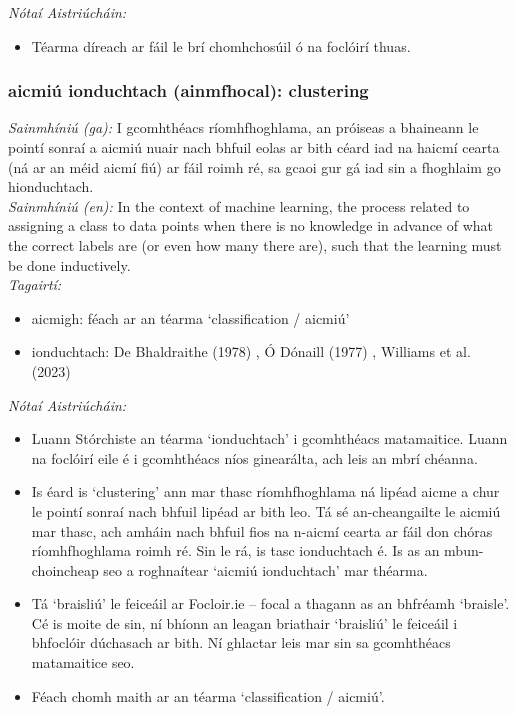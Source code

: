 \documentclass{article}
\begin{document}
 \noindent \textit{Nótaí Aistriúcháin:}
\begin{itemize}
	\item Téarma díreach ar fáil le brí chomhchosúil ó na foclóirí thuas.
\end{itemize}


\subsubsection*{aicmiú ionduchtach (ainmfhocal): clustering}
 \noindent \textit{Sainmhíniú (ga):} I gcomhthéacs ríomhfhoghlama, an próiseas a bhaineann le pointí sonraí a aicmiú nuair nach bhfuil eolas ar bith céard iad na haicmí cearta (ná ar an méid aicmí fiú) ar fáil roimh ré, sa gcaoi gur gá iad sin a fhoghlaim go hionduchtach.
\\
 \noindent \textit{Sainmhíniú (en):} In the context of machine learning, the process related to assigning a class to data points when there is no knowledge in advance of what the correct labels are (or even how many there are), such that the learning must be done inductively.
\\
 \noindent \textit{Tagairtí:}
\begin{itemize}
	\item aicmigh: féach ar an téarma `classification / aicmiú'
	\item ionduchtach: De Bhaldraithe (1978) \cite{de-bhaldraithe}, Ó Dónaill (1977) \cite{odonaill}, Williams et al. (2023) \cite{storchiste}
\end{itemize}

 \noindent \textit{Nótaí Aistriúcháin:}
\begin{itemize}
	\item Luann Stórchiste an téarma `ionduchtach' i gcomhthéacs matamaitice. Luann na foclóirí eile é i gcomhthéacs níos ginearálta, ach leis an mbrí chéanna.
	\item Is éard is `clustering' ann mar thasc ríomhfhoghlama ná lipéad aicme a chur le pointí sonraí nach bhfuil lipéad ar bith leo. Tá sé an-cheangailte le aicmiú mar thasc, ach amháin nach bhfuil fios na n-aicmí cearta ar fáil don chóras ríomhfhoghlama roimh ré. Sin le rá, is tasc ionduchtach é. Is as an mbun-choincheap seo a roghnaítear `aicmiú ionduchtach' mar théarma.
	\item Tá `braisliú' le feiceáil ar Focloir.ie -- focal a thagann as an bhfréamh `braisle'. Cé is moite de sin, ní bhíonn an leagan briathair `braisliú' le feiceáil i bhfoclóir dúchasach ar bith. Ní ghlactar leis mar sin sa gcomhthéacs matamaitice seo.
	\item Féach chomh maith ar an téarma `classification / aicmiú'.
\end{itemize}
\end{document}
